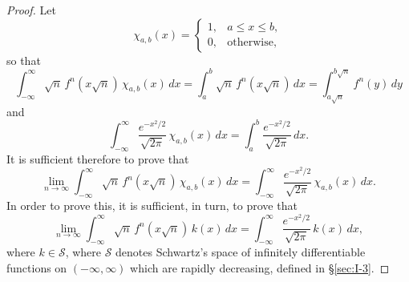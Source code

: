 \begin{proof}
Let
\begin{equation*}
\chi_{a,b}(x)=
\begin{cases}
1,&a\le x\le b,\\
0,&\text{otherwise},
\end{cases}
\end{equation*}
so that
\begin{equation*}
\int_{-\infty}^{\infty}\sqrt n\,f^n(x\sqrt n)\,\chi_{a,b}(x)\,dx
=\int_{a}^{b}\sqrt n\,f^n(x\sqrt n)\,dx
=\int_{a\sqrt n}^{b\sqrt n}f^n(y)\,dy
\end{equation*}
and
\begin{equation*}
\int_{-\infty}^{\infty}\frac{e^{-x^{2}/2}}{\sqrt{2\pi}}\,\chi_{a,b}(x)\,dx
=\int_{a}^{b}\frac{e^{-x^{2}/2}}{\sqrt{2\pi}}\,dx.
\end{equation*}
It is sufficient therefore to prove that
\begin{equation}\label{eq:I-10.1}\tag{10.1}
\lim_{n\to\infty}\int_{-\infty}^{\infty}\sqrt n\,f^n(x\sqrt n)\,\chi_{a,b}(x)\,dx
=\int_{-\infty}^{\infty}\frac{e^{-x^{2}/2}}{\sqrt{2\pi}}\,\chi_{a,b}(x)\,dx.
\end{equation}
In order to prove this, it is sufficient, in turn, to prove that
\begin{equation}\label{eq:I-10.2}\tag{10.2}
\lim_{n\to\infty}\int_{-\infty}^{\infty}\sqrt n\,f^n(x\sqrt n)\,k(x)\,dx
=\int_{-\infty}^{\infty}\frac{e^{-x^{2}/2}}{\sqrt{2\pi}}\,k(x)\,dx,
\end{equation}
where $k\in\mathcal S$, where $\mathcal S$ denotes Schwartz's space of infinitely differentiable functions on $(-\infty,\infty)$ which are rapidly decreasing, defined in \S\ref{sec:I-3}.


\end{proof}

